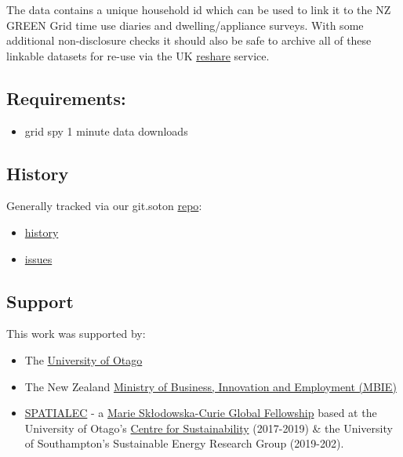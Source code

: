 \documentclass[]{article}
\providecommand{\tightlist}{%
  \setlength{\itemsep}{0pt}\setlength{\parskip}{0pt}}
\begin{document}
The data contains a unique household id which can be used to link it to
the NZ GREEN Grid time use diaries and dwelling/appliance surveys. With
some additional non-disclosure checks it should also be safe to archive
all of these linkable datasets for re-use via the UK
\href{http://reshare.ukdataservice.ac.uk/}{reshare} service.

\subsection{Requirements:}\label{requirements}

\begin{itemize}
\tightlist
\item
  grid spy 1 minute data downloads
\end{itemize}

\subsection{History}\label{history}

Generally tracked via our git.soton
\href{https://git.soton.ac.uk/ba1e12/nzGREENGrid}{repo}:

\begin{itemize}
\tightlist
\item
  \href{https://git.soton.ac.uk/ba1e12/nzGREENGrid/commits/master}{history}
\item
  \href{https://git.soton.ac.uk/ba1e12/nzGREENGrid/issues}{issues}
\end{itemize}

\subsection{Support}\label{support}

This work was supported by:

\begin{itemize}
\tightlist
\item
  The \href{https://www.otago.ac.nz/}{University of Otago}
\item
  The New Zealand \href{http://www.mbie.govt.nz/}{Ministry of Business,
  Innovation and Employment (MBIE)}
\item
  \href{http://www.energy.soton.ac.uk/tag/spatialec/}{SPATIALEC} - a
  \href{http://ec.europa.eu/research/mariecurieactions/about-msca/actions/if/index_en.htm}{Marie
  Skłodowska-Curie Global Fellowship} based at the University of Otago's
  \href{http://www.otago.ac.nz/centre-sustainability/staff/otago673896.html}{Centre
  for Sustainability} (2017-2019) \& the University of Southampton's
  Sustainable Energy Research Group (2019-202).
\end{itemize}
\end{document}
